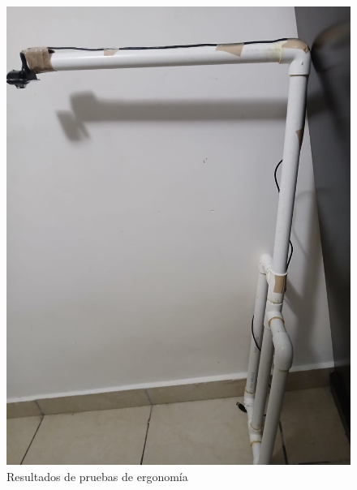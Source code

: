 \begin{figure}
    \centering
    \includegraphics[width=1\textwidth, height=.9\textheight]{img/PruebaErgonomica6.png}
    \caption{Resultados de pruebas de ergonomía}
    \label{fig:ergo-test6}
\end{figure}


